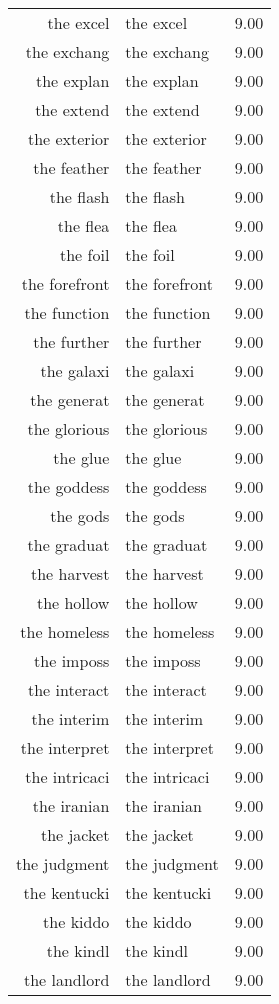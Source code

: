 \begin{table}[ht]
\begin{tabular}{rlr}
  the excel & the excel & 9.00 \\ 
  the exchang & the exchang & 9.00 \\ 
  the explan & the explan & 9.00 \\ 
  the extend & the extend & 9.00 \\ 
  the exterior & the exterior & 9.00 \\ 
  the feather & the feather & 9.00 \\ 
  the flash & the flash & 9.00 \\ 
  the flea & the flea & 9.00 \\ 
  the foil & the foil & 9.00 \\ 
  the forefront & the forefront & 9.00 \\ 
  the function & the function & 9.00 \\ 
  the further & the further & 9.00 \\ 
  the galaxi & the galaxi & 9.00 \\ 
  the generat & the generat & 9.00 \\ 
  the glorious & the glorious & 9.00 \\ 
  the glue & the glue & 9.00 \\ 
  the goddess & the goddess & 9.00 \\ 
  the gods & the gods & 9.00 \\ 
  the graduat & the graduat & 9.00 \\ 
  the harvest & the harvest & 9.00 \\ 
  the hollow & the hollow & 9.00 \\ 
  the homeless & the homeless & 9.00 \\ 
  the imposs & the imposs & 9.00 \\ 
  the interact & the interact & 9.00 \\ 
  the interim & the interim & 9.00 \\ 
  the interpret & the interpret & 9.00 \\ 
  the intricaci & the intricaci & 9.00 \\ 
  the iranian & the iranian & 9.00 \\ 
  the jacket & the jacket & 9.00 \\ 
  the judgment & the judgment & 9.00 \\ 
  the kentucki & the kentucki & 9.00 \\ 
  the kiddo & the kiddo & 9.00 \\ 
  the kindl & the kindl & 9.00 \\ 
  the landlord & the landlord & 9.00 \\ 

\end{tabular}
\end{table}

